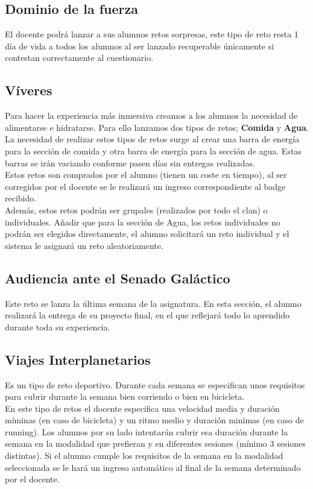 \subsection{Dominio de la fuerza}
El docente podrá lanzar a sus alumnos retos sorpresas, este tipo de reto resta 1 día de vida a todos los alumnos al ser lanzado recuperable únicamente si contestan correctamente al cuestionario.

\subsection{Víveres}
Para hacer la experiencia más inmersiva creamos a los alumnos la necesidad de alimentarse e hidratarse. Para ello lanzamos dos tipos de retos; \textbf{Comida} y \textbf{Agua}. La necesidad de realizar estos tipos de retos surge al crear una barra de energía para la sección de comida y otra barra de energía para la sección de agua. Estas barras se irán vaciando conforme pasen días sin entregas realizadas.\\

Estos retos son comprados por el alumno (tienen un coste en tiempo), al ser corregidos por el docente se le realizará un ingreso correspondiente al badge recibido.\\

Además, estos retos podrán ser grupales (realizados por todo el clan) o individuales. Añadir que para la sección de Agua, los retos individuales no podrán ser elegidos directamente, el alumno solicitará un reto individual y el sistema le asignará un reto aleatoriamente.

\subsection{Audiencia ante el Senado Galáctico}
Este reto se lanza la última semana de la asignatura. En esta sección, el alumno realizará la entrega de su proyecto final, en el que reflejará todo lo aprendido durante toda su experiencia.

\subsection{Viajes Interplanetarios}
Es un tipo de reto deportivo. Durante cada semana se especifican unos requisitos para cubrir durante la semana bien corriendo o bien en bicicleta.\\

En este tipo de retos el docente especifica una velocidad media y duración míminas (en caso de bicicleta) y un ritmo medio y duración minimas (en caso de running). Los alumnos por su lado intentarán cubrir esa duración durante la semana en la modalidad que prefieran y en diferentes sesiones (mínimo 3 sesiones distintas). Si el alumno cumple los requisitos de la semana en la modalidad seleccionada se le hará un ingreso automático al final de la semana determinado por el docente.

